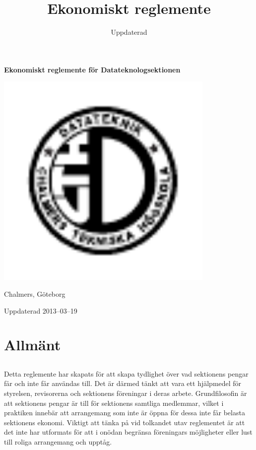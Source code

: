\documentclass{dtek}
\title{Ekonomiskt reglemente}
\date{Uppdaterad \updated}
\newcommand{\updated}{2013--03--19}
\begin{document}
\makeheadfoot%

\vspace*{\fill}
\begin{center}
  {\Huge \textbf{Ekonomiskt reglemente för Datateknologsektionen}}
  
  \includegraphics[width=300pt]{Datalogo.pdf}
  
  {\LARGE Chalmers, Göteborg}

  \vspace{2cm}

  {\LARGE Uppdaterad \updated}
\end{center}
\vfill

\newpage

\setcounter{tocdepth}{1}
\tableofcontents

\newpage

\section{Allmänt}
\subsection{}
Detta reglemente har skapats för att skapa tydlighet över vad sektionens pengar får och inte får användas till. Det är därmed tänkt att vara ett hjälpmedel för styrelsen, revisorerna och sektionens föreningar i deras arbete. Grundfilosofin är att sektionens pengar är till för sektionens samtliga medlemmar, vilket i praktiken innebär att arrangemang som inte är öppna för dessa inte får belasta sektionens ekonomi. Viktigt att tänka på vid tolkandet utav reglementet är att det inte har utformats för att i onödan begränsa föreningars möjligheter eller lust till roliga arrangemang och upptåg.
\end{document}
